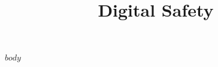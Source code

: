 \documentclass{article}
\title{Digital Safety}
\author{}
\date{}
\begin{document}
\maketitle


$body$
\end{document}
